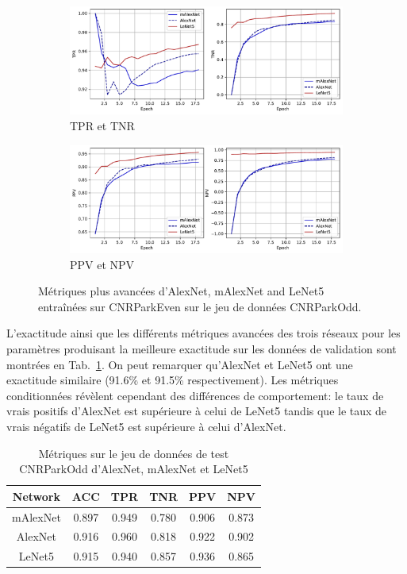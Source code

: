 \documentclass[12pt]{article}
\begin{document}
\begin{figure}[htbp]
    \centering
    \begin{subfigure}{\textwidth}
        \includegraphics[width=\textwidth]{figures/metrics/true_rates.pdf}
        \caption{TPR et TNR}
    \end{subfigure}
    \begin{subfigure}{\textwidth}
        \includegraphics[width=\textwidth]{figures/metrics/predictive_values.pdf}
        \caption{PPV et NPV}
    \end{subfigure}
    \caption{Métriques plus avancées d'AlexNet, mAlexNet and LeNet5 entraînées sur CNRParkEven sur le jeu de données CNRParkOdd.}
    \label{fig:networks_confusion_mat}
\end{figure}

L'exactitude ainsi que les différents métriques avancées des trois réseaux pour les paramètres produisant la meilleure exactitude sur les données de validation sont montrées en Tab.~\ref{tab:results_acc}. On peut remarquer qu'AlexNet et LeNet5 ont une exactitude similaire (91.6\% et 91.5\% respectivement). Les métriques conditionnées révèlent cependant des différences de comportement: le taux de vrais positifs d'AlexNet est supérieure à celui de LeNet5 tandis que le taux de vrais négatifs de LeNet5 est supérieure à celui d'AlexNet.

\begin{table}[htbp]
    \centering
    \begin{tabular}{c | c | c | c | c | c}
        Network & ACC & TPR & TNR & PPV & NPV \\
        \hline
        mAlexNet & 0.897 &      0.949 &      0.780 &      0.906 &      0.873 \\
        AlexNet & 0.916 &      0.960 &      0.818 &      0.922 &      0.902 \\
        LeNet5 & 0.915 &      0.940 &      0.857 &      0.936 &      0.865
    \end{tabular}
    \caption{Métriques sur le jeu de données de test CNRParkOdd d'AlexNet, mAlexNet et LeNet5}
    \label{tab:results_acc}
\end{table}
\end{document}
